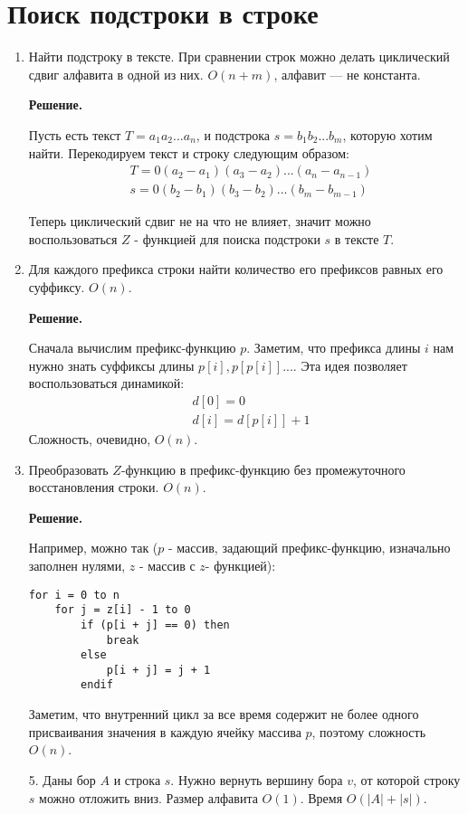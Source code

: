 \section*{Поиск подстроки в строке}
\begin{enumerate}
	\item Найти подстроку в тексте. При сравнении строк можно делать циклический сдвиг алфавита в одной из них. 
	$O(n + m)$, алфавит — не константа.
	
	\textbf{Решение.}
	
	Пусть есть текст $T = a_1a_2...a_n$, и подстрока $s = b_1b_2...b_m$, которую хотим найти. Перекодируем текст и 
	строку следующим образом:
	\begin{align*}
		& T = 0(a_2 - a_1)(a_3 - a_2)...(a_n - a_{n - 1}) \\
		& s = 0(b_2 - b_1)(b_3 - b_2)...(b_m - b_{m - 1})
	\end{align*}
	
	Теперь циклический сдвиг не на что не влияет, значит можно воспользоваться $Z$ - функцией для поиска подстроки 
	$s$ в тексте $T$.
	
	\item Для каждого префикса строки найти количество его префиксов равных его суффиксу. $O(n)$.
	
	\textbf{Решение.}
	
	Сначала вычислим префикс-функцию $p$. Заметим, что префикса длины $i$ нам нужно знать суффиксы длины $p[i], 
	p[p[i]]...$. Эта идея позволяет воспользоваться динамикой:
	\begin{align*}
		& d[0] = 0 \\
		& d[i] = d[p[i]] + 1
	\end{align*}
	Сложность, очевидно, $O(n)$.
	
	\item Преобразовать $Z$-функцию в префикс-функцию без промежуточного восстановления строки. $O(n)$.
	
	\textbf{Решение.}
	
	Например, можно так ($p$ - массив, задающий префикс-функцию, изначально заполнен нулями, $z$ - массив с $z$- 
	функцией):
	\begin{lstlisting}
for i = 0 to n
	for j = z[i] - 1 to 0
		if (p[i + j] == 0) then
			break
		else
			p[i + j] = j + 1
		endif
	\end{lstlisting}
	
	Заметим, что внутренний цикл за все время содержит не более одного присваивания значения в каждую ячейку 
	массива $p$, поэтому сложность $O(n)$. 
	\item[5.] Даны бор $A$ и строка $s$. Нужно вернуть вершину бора $v$, от которой строку $s$ можно отложить вниз. 
	Размер алфавита $O(1)$. Время $O(|A| + |s|)$.
	

\end{enumerate}
